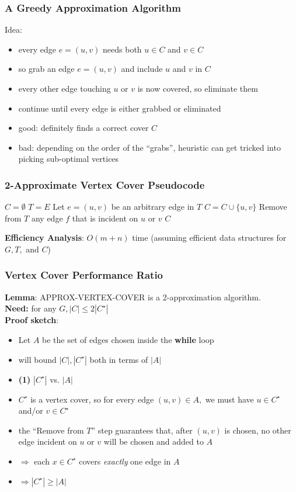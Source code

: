\documentclass{beamer}
\begin{document}
\begin{frame} \frametitle{A Greedy Approximation Algorithm}
Idea:
\begin{itemize}
  \item every edge $e=(u,v)$ needs both $u \in C$ and $v \in C$
  \item so grab an edge $e=(u,v)$ and include $u$ and $v$ in $C$
  \item every other edge touching $u$ or $v$ is now covered, so eliminate them
  \item continue until every edge is either grabbed or eliminated
  \item good: definitely finds a correct cover $C$
  \item bad: depending on the order of the ``grabs'', heuristic can get tricked
    into picking sub-optimal vertices
\end{itemize}
\end{frame}

\begin{frame} \frametitle{2-Approximate Vertex Cover Pseudocode}
  \begin{algorithmic}[1]
      \State $C=\emptyset$
      \State $T=E$ 
        \State Let $e=(u, v)$ be an arbitrary edge in $T$
        \State $C = C \cup \{u, v \}$
        \State Remove from $T$ any edge $f$ that is incident on $u$ or $v$
      \EndWhile
      \State \Return $C$
    \EndFunction
  \end{algorithmic}
\vspace{.5cm}
\textbf{Efficiency Analysis}: $O(m+n)$ time (assuming efficient data structures
for $G, T,$ and $C$)
\end{frame}

\begin{frame} \frametitle{Vertex Cover Performance Ratio}
\textbf{Lemma}: APPROX-VERTEX-COVER is a 2-approximation algorithm. \\
\textbf{Need:} for any $G, |C| \leq 2 |C^\star|$ \\
\textbf{Proof sketch}:
\begin{itemize}
  \item Let $A$ be the set of edges chosen inside the \textbf{while} loop
  \item will bound $|C|, |C^\star|$ both in terms of $|A|$
  \item \textbf{(1)} $|C^\star|$ vs. $|A|$
  \item $C^\star$ is a vertex cover, so for every edge $(u, v) \in A,$ we must have
    $u \in C^\star$ and/or $v \in C^\star$
  \item the ``Remove from $T$'' step guarantees that, after $(u, v)$ is chosen,
    no other edge incident on $u$ or $v$ will be chosen and added to $A$
  \item $\Rightarrow$ each $x \in C^\star$ covers \emph{exactly} one edge in $A$
  \item $\Rightarrow |C^\star| \geq |A|$
\end{itemize}
\end{frame}
\end{document}
